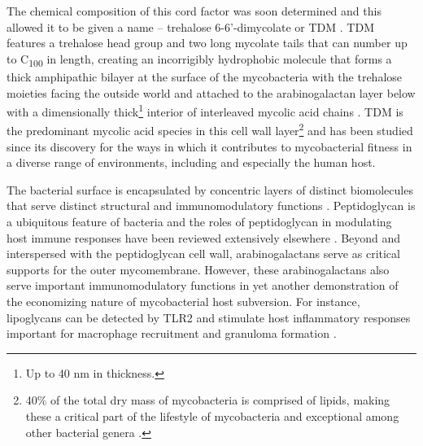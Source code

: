 The chemical composition of this cord factor was soon determined and this allowed it to be given a name -- trehalose 6\hyp{}6'\hyp{}dimycolate or TDM \citep{Noll1956a}. TDM features a trehalose head group and two long mycolate tails that can number up to C\textsubscript{100} in length, creating an incorrigibly hydrophobic molecule that forms a thick amphipathic bilayer at the surface of the mycobacteria with the trehalose moieties facing the outside world and attached to the arabinogalactan layer below with a dimensionally thick\footnote{Up to 40 nm in thickness.} interior of interleaved mycolic acid chains \citep{Glickman2008, Welsh2013, BansalMutalik2014, Adhyapak2020, Alderwick2015, Batt2020}. TDM is the predominant mycolic acid species in this cell wall layer\footnote{40\% of the total dry mass of mycobacteria is comprised of lipids, making these a critical part of the lifestyle of mycobacteria and exceptional among other bacterial genera \citep{Jackson2014}.} and has been studied since its discovery for the ways in which it contributes to mycobacterial fitness in a diverse range of environments, including and especially the human host.

The bacterial surface is encapsulated by concentric layers of distinct biomolecules that serve distinct structural and immunomodulatory functions \citep{Neyrolles2011}. Peptidoglycan is a ubiquitous feature of bacteria and the roles of peptidoglycan in modulating host immune responses have been reviewed extensively elsewhere \citep{Kang1998a, Guan2007, Wolf2018}. Beyond and interspersed with the peptidoglycan cell wall, arabinogalactans serve as critical supports for the outer mycomembrane. However, these arabinogalactans also serve important immunomodulatory functions in yet another demonstration of the economizing nature of mycobacterial host subversion. For instance, lipoglycans can be detected by TLR2 and stimulate host inflammatory responses important for macrophage recruitment and granuloma formation \citep{Gilleron2006}.

